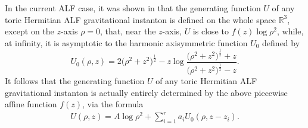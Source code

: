 \documentclass[10pt,a4paper]{amsart}
\numberwithin{equation}{section}
\begin{document}
In the current ALF case, it was shown in \cite[Section~5]{BG} that the generating function $U$ of any toric Hermitian ALF gravitational instanton is defined on the whole space $\mathbb{R} ^3$, except on the $z$-axis $\rho = 0$, that, near the $z$-axis, $U$ is close to $f (z) \log{\rho ^2}$, while, at infinity, it is asymptotic to the harmonic axisymmetric function $U_0$ defined by
\[%
 U _0 (\rho, z) = 2 \big(\rho ^2 + z ^2\big) ^{\frac{1}{2}} - z \log{\frac{\big(\rho ^2 + z^2\big) ^{\frac{1}{2}} + z}{\big(\rho ^2 + z^2\big) ^{\frac{1}{2}}- z}}.\]
It follows that the generating function $U$ of any toric Hermitian ALF gravitational instanton is actually entirely determined by the above piecewise affine function $f (z)$, via the formula
\begin{gather} \label{U} U (\rho, z) = A \log{\rho ^2} + \sum _{i = 1} ^r a _i U_0 (\rho, z - z_i). \end{gather}
\end{document}
